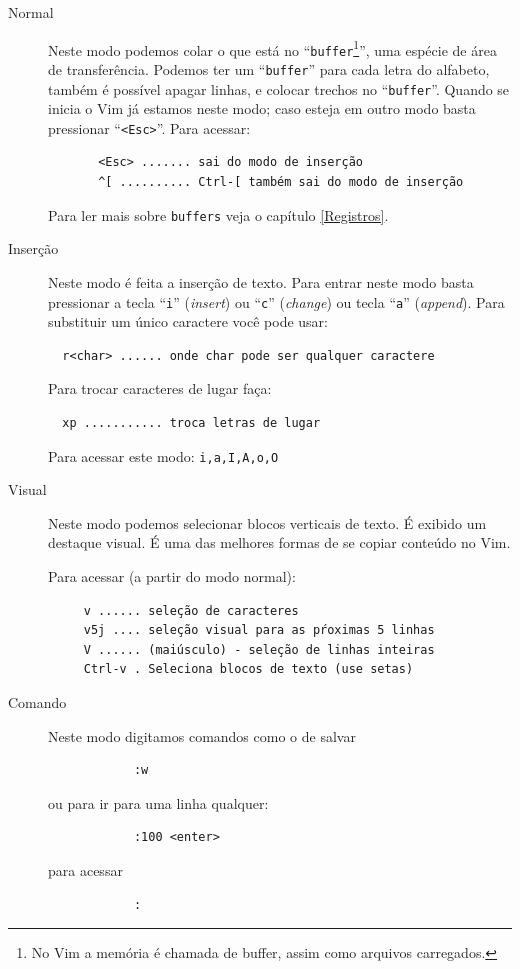 \documentclass[10pt,a4paper,openany]{book}
\begin{document}
\begin{description}

\item [Normal] Neste modo podemos colar o que está no
 ``\verb|buffer|\footnote{No Vim a memória é chamada de buffer, assim como
 arquivos carregados.}'', uma espécie de área de transferência. Podemos ter um
 ``\verb|buffer|'' para cada letra do alfabeto, também é possível apagar linhas, e
 colocar trechos no ``\verb|buffer|''. Quando se inicia o Vim já estamos neste modo;
 caso esteja em outro modo basta pressionar ``\verb|<Esc>|''.  Para acessar:

\begin{verbatim}
	   <Esc> ....... sai do modo de inserção
	   ^[ .......... Ctrl-[ também sai do modo de inserção
\end{verbatim}

Para ler mais sobre \verb|buffers| veja o capítulo \ref{Registros}.

\item [Inserção]
Neste modo é feita a inserção de texto. Para entrar neste modo basta
pressionar a tecla ``\verb|i|'' ({\em insert}) ou ``\verb|c|'' ({\em change})
ou tecla ``\verb|a|'' ({\em append}).  Para substituir um único caractere você
pode usar:

\begin{verbatim}
  r<char> ...... onde char pode ser qualquer caractere
\end{verbatim}

Para trocar caracteres de lugar faça:

\begin{verbatim}
  xp ........... troca letras de lugar
\end{verbatim}


Para acessar este modo:  \verb+i,a,I,A,o,O+

\item [Visual] Neste modo podemos selecionar blocos verticais de texto. É
exibido um destaque visual. É uma das melhores formas de se copiar
conteúdo no Vim.

Para acessar (a partir do modo normal):

\begin{verbatim}
	 v ...... seleção de caracteres
	 v5j .... seleção visual para as pŕoximas 5 linhas
	 V ...... (maiúsculo) - seleção de linhas inteiras
	 Ctrl-v . Seleciona blocos de texto (use setas)
\end{verbatim}

\item [Comando] Neste modo digitamos comandos como o de salvar

\begin{verbatim}
			:w
\end{verbatim}

ou para ir para uma linha qualquer:

\begin{verbatim}
			:100 <enter>
\end{verbatim}

para acessar
\begin{verbatim}
			:
\end{verbatim}

\end{description}
\end{document}
